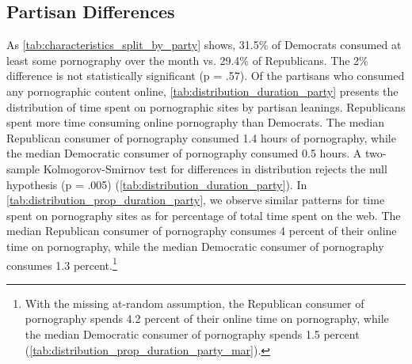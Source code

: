 \documentclass[12pt,twoside]{article}
\begin{document}
\subsection{Partisan Differences}
\label{subsec:partisan_differences}
As \cref{tab:characteristics_split_by_party} shows, 31.5\% of Democrats consumed at least some pornography over the month vs. 29.4\% of Republicans. The 2\% difference is not statistically significant (p = .57). Of the partisans who consumed any pornographic content online, \cref{tab:distribution_duration_party} presents the distribution of time spent on pornographic sites by partisan leanings. Republicans spent more time consuming online pornography than Democrats. The median Republican consumer of pornography consumed 1.4 hours of pornography, while the median Democratic consumer of pornography consumed 0.5 hours. A two-sample Kolmogorov-Smirnov test for differences in distribution rejects the null hypothesis (p = .005) (\cref{tab:distribution_duration_party}). In \cref{tab:distribution_prop_duration_party}, we observe similar patterns for time spent on pornography sites as for percentage of total time spent on the web. The median Republican consumer of pornography consumes 4 percent of their online time on pornography, while the median Democratic consumer of pornography consumes 1.3 percent.\footnote{
    With the missing at-random assumption, the Republican consumer of pornography spends 4.2 percent of their online time on pornography, while the median Democratic consumer of pornography spends 1.5 percent (\cref{tab:distribution_prop_duration_party_mar}).
}
\end{document}
